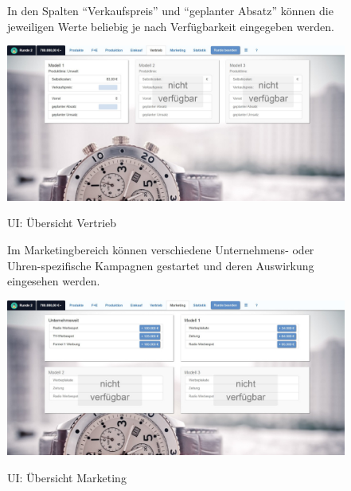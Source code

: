 \begin{figure}
\begin{minipage}{\textwidth}
In den Spalten \enquote{Verkaufspreis} und \enquote{geplanter Absatz} können die jeweiligen Werte beliebig je nach Verfügbarkeit eingegeben werden.\\
\end{minipage}
	\centering
	\includegraphics[scale=0.3]{img/bilder_layout/vertrieb.jpeg}
	\label{fig:abb20}
	\caption{UI: Übersicht Vertrieb} 
\end{figure}

\begin{figure}
\begin{minipage}{\textwidth}
Im Marketingbereich können verschiedene Unternehmens- oder Uhren-spezifische Kampagnen gestartet und deren Auswirkung eingesehen werden.\\
\end{minipage}
	\centering
	\includegraphics[scale=0.3]{img/bilder_layout/marketing.jpeg}
	\label{fig:abb21}
	\caption{UI: Übersicht Marketing} 
\end{figure}

